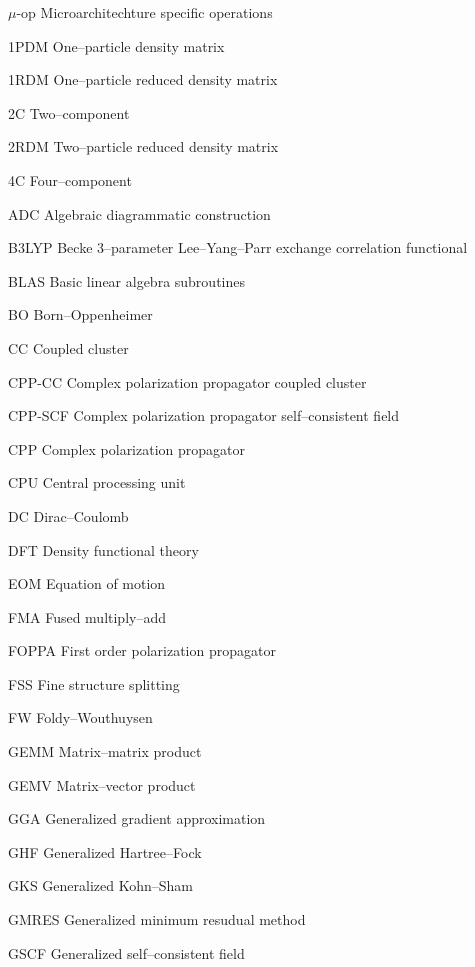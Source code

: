 \begin{glossary}
  \item[$\mu$-op]    Microarchitechture specific operations
  \item[1PDM]        One--particle density matrix
  \item[1RDM]        One--particle reduced density matrix
  \item[2C]          Two--component
  \item[2RDM]        Two--particle reduced density matrix
  \item[4C]          Four--component
  \item[ADC]         Algebraic diagrammatic construction
  \item[B3LYP]       Becke 3--parameter Lee--Yang--Parr exchange correlation functional
  \item[BLAS]        Basic linear algebra subroutines
  \item[BO]          Born--Oppenheimer
  \item[CC]          Coupled cluster
  \item[CPP-CC]      Complex polarization propagator coupled cluster
  \item[CPP-SCF]     Complex polarization propagator self--consistent field
  \item[CPP]         Complex polarization propagator
  \item[CPU]         Central processing unit
  \item[DC]          Dirac--Coulomb
  \item[DFT]         Density functional theory
  \item[EOM]         Equation of motion
  \item[FMA]         Fused multiply--add
  \item[FOPPA]       First order polarization propagator
  \item[FSS]         Fine structure splitting
  \item[FW]          Foldy--Wouthuysen
  \item[GEMM]        Matrix--matrix product
  \item[GEMV]        Matrix--vector product
  \item[GGA]         Generalized gradient approximation
  \item[GHF]         Generalized Hartree--Fock
  \item[GKS]         Generalized Kohn--Sham
  \item[GMRES]       Generalized minimum resudual method
  \item[GSCF]        Generalized self--consistent field

\end{glossary}
